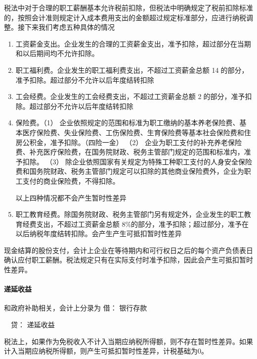 \documentclass[UTF8,12pt]{ctexart}
\newenvironment{Dr}{\noindent 借：}{\par}
\newenvironment{Cr}{\noindent \ \ 贷：}{\par}
\numberwithin{equation}{section} %
\numberwithin{figure}{section}
\numberwithin{table}{section}
\begin{document}
	税法中对于合理的职工薪酬基本允许税前扣除，但税法中明确规定了税前扣除标准的，按照会计准则规定计入成本费用支出的金额超过规定标准部分，应进行纳税调整。接下来我们考虑五种具体的情况
	\begin{enumerate}
		\item 工资薪金支出。企业发生的合理的工资薪金支出，准予扣除，超过部分在当期和以后期间均不允许扣除。
		
		\item 职工福利费。企业发生的职工福利费支出，不超过工资薪金总额 14的部分，准予扣除。超过部分不允许以后年度结转扣除
		
		\item 工会经费。企业发生的工会经费支出，不超过工资薪金总额 2的部分，准予扣除。超过部分不允许以后年度结转扣除
		
		\item 保险费。（1）	企业依照规定的范围和标准为职工缴纳的基本养老保险费、基本医疗保险费、失业保险费、工伤保险费、生育保险费等基本社会保险费和住房公积金，准予扣除。（四险一金）
		（2）	企业为职工支付的补充养老保险费、补充医疗保险费，在国务院财政、税务主管部门规定的范围和标准内，准予扣除。
		（3）	除企业依照国家有关规定为特殊工种职工支付的人身安全保险费和国务院财政、税务主管部门规定可以扣除的其他商业保险费外，企业为职工支付的商业保险费，不得扣除。
		
		以上四种情况都不会产生暂时性差异
		
		\item 职工教育经费。除国务院财政、税务主管部门另有规定外，企业发生的职工教育经费支出，不超过工资薪金总额 8\%的部分，准予扣除；超过部分，准予在以后纳税年度结转扣除。会产生产生可抵扣暂时性差异
	\end{enumerate}
	
	现金结算的股份支付，会计上企业在等待期内和可行权日之后的每个资产负债表日确认应付职工薪酬。税法规定只有在实际支付时准予扣除，因此会产生可抵扣暂时性差异。
	
	\paragraph{递延收益}
	和政府补助相关，会计上分录为
	\begin{Dr}
		银行存款
	\end{Dr}
	\begin{Cr}
		递延收益
	\end{Cr}
	
	税法上，如果作为免税收入不计入当期应纳税所得额，则不存在暂时性差异。如果计入当期应纳税所得额，则产生可抵扣暂时性差异，计税基础为0。
	
\end{document}
